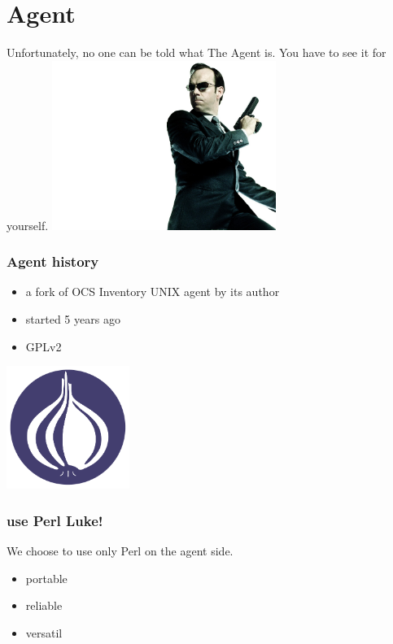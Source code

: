 %
\section{Agent}
Unfortunately, no one can be told what The Agent is. You have to see it for yourself.
\includegraphics[height=5.5cm]{./pics/agent-smith.jpg}
\begin{frame}
\frametitle{Agent history}

\begin{itemize}
%
\item a fork of OCS Inventory UNIX agent by its author
\item started 5 years ago
\item GPLv2
%
\end{itemize}
\end{frame}
\begin{frame}
\includegraphics[height=4.0cm]{pics/Perl_Foundation.pdf}
\frametitle{use Perl Luke!}

We choose to use only Perl on the agent side.
\begin{itemize}
\item portable
\item reliable
\item versatil
\end{itemize}
\end{frame}

